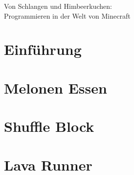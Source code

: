 \documentclass{article}
\begin{document}
	\begin{center}
		\huge Von Schlangen und Himbeerkuchen:\\Programmieren in der Welt von Minecraft
	\end{center}
	\section{Einführung}
		
	\section{Melonen Essen}
		\subsection{}
		
		\subsection{}			
		
	\section{Shuffle Block}
		\subsection{}
		
		\subsection{}
		
	\section{Lava Runner}
		
\end{document}
